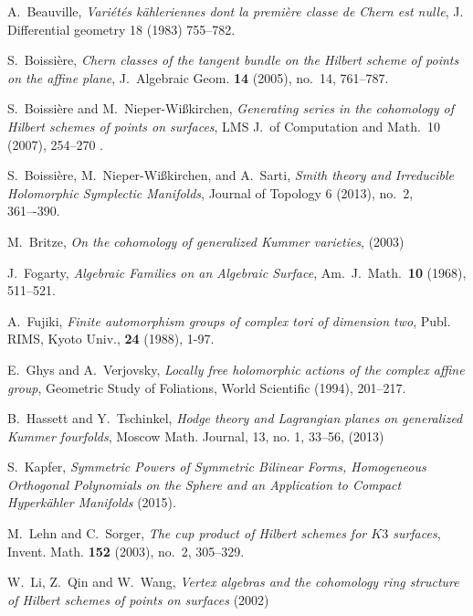
\begin{thebibliography}{10}

A.~Beauville, \emph{Vari\'et\'es k\"ahleriennes dont la premi\`ere classe de Chern est nulle}, 
  J. Differential geometry 18 (1983) 755--782.

S.~Boissi\`ere, \emph{Chern classes of the tangent bundle on the Hilbert scheme of points
  on the affine plane}, J.~Algebraic Geom. \textbf{14} (2005), no.~14, 761--787.

S.~Boissi\`ere and M.~Nieper-Wi{\ss}kirchen, \emph{Generating series in the cohomology 
  of Hilbert schemes of points on surfaces}, LMS J.~of Computation and Math.~10 (2007), 254--270 .

S.~Boissi\`ere, M.~Nieper-Wi{\ss}kirchen, and A.~Sarti, \emph{Smith theory and 
  Irreducible Holomorphic Symplectic Manifolds}, Journal of Topology 6 (2013), no.~2, 361–-390.

M.~Britze, \emph{On the cohomology of generalized Kummer varieties}, (2003) 

J.~Fogarty, \emph{Algebraic Families on an Algebraic Surface},
  Am.~J.~Math.~\textbf{10} (1968), 511--521.

A.~Fujiki, \emph{Finite automorphism groups of complex tori of dimension two}, Publ. RIMS,
  Kyoto Univ., \textbf{24} (1988), 1-97.

E.~Ghys and A.~Verjovsky, \emph{Locally free holomorphic actions of the complex affine group},
  Geometric Study of Foliations, World Scientific (1994), 201--217.

B.~Hassett and Y.~Tschinkel, \emph{ Hodge theory and Lagrangian planes on 
  generalized Kummer fourfolds}, Moscow Math. Journal, 13, no. 1, 33--56, (2013) 
  
S.~Kapfer, \emph{Symmetric Powers of Symmetric Bilinear Forms, Homogeneous Orthogonal Polynomials 
  on the Sphere and an Application to Compact Hyperk\"ahler Manifolds} (2015).
  
M.~Lehn and C.~Sorger, \emph{The cup product of Hilbert schemes for {$K3$}
  surfaces}, Invent. Math. \textbf{152} (2003), no.~2, 305--329.

W.~Li, Z.~Qin and W.~Wang, \emph{Vertex algebras and the cohomology ring structure of 
  Hilbert schemes of points on surfaces} (2002)


\end{thebibliography}

